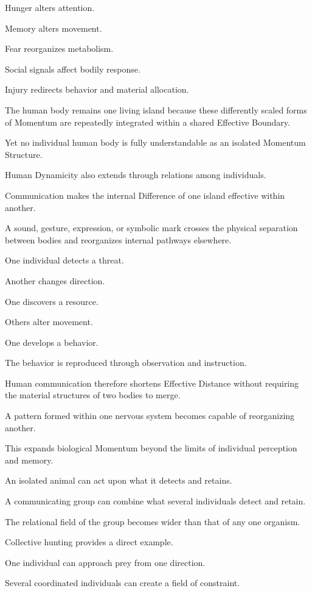 Hunger alters attention.

Memory alters movement.

Fear reorganizes metabolism.

Social signals affect bodily response.

Injury redirects behavior and material allocation.

The human body remains one living island because these differently scaled forms of Momentum are repeatedly integrated within a shared Effective Boundary.

Yet no individual human body is fully understandable as an isolated Momentum Structure.

Human Dynamicity also extends through relations among individuals.

Communication makes the internal Difference of one island effective within another.

A sound, gesture, expression, or symbolic mark crosses the physical separation between bodies and reorganizes internal pathways elsewhere.

One individual detects a threat.

Another changes direction.

One discovers a resource.

Others alter movement.

One develops a behavior.

The behavior is reproduced through observation and instruction.

Human communication therefore shortens Effective Distance without requiring the material structures of two bodies to merge.

A pattern formed within one nervous system becomes capable of reorganizing another.

This expands biological Momentum beyond the limits of individual perception and memory.

An isolated animal can act upon what it detects and retains.

A communicating group can combine what several individuals detect and retain.

The relational field of the group becomes wider than that of any one organism.

Collective hunting provides a direct example.

One individual can approach prey from one direction.

Several coordinated individuals can create a field of constraint.

